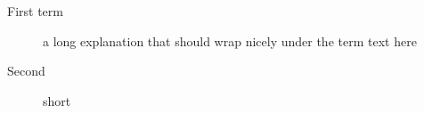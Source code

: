 \begin{description}
  \item[First term] a long explanation that should wrap
        nicely under the term text here
  \item[Second] short
\end{description}
